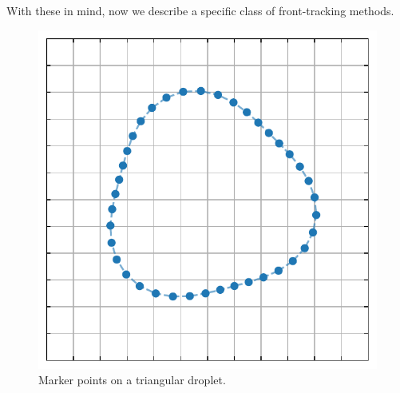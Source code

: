 With these in mind, now we describe a specific class of front-tracking methods.

\begin{figure}%
  \centering
  \includegraphics[width=0.6\columnwidth]{marker-points.pdf}
  \caption{Marker points on a triangular droplet.}
  \label{fig:front-track}
\end{figure}



